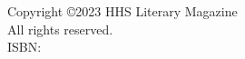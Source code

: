 \begin{center}
Copyright \copyright 2023 HHS Literary Magazine\\
All rights reserved.\\
ISBN:\\
\end{center}
